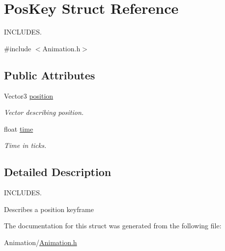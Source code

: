 \hypertarget{structPosKey}{}\section{Pos\+Key Struct Reference}
\label{structPosKey}


I\+N\+C\+L\+U\+D\+ES.  




{\ttfamily \#include $<$Animation.\+h$>$}

\subsection*{Public Attributes}
\begin{DoxyCompactItemize}
\item 
\mbox{\label{structPosKey_ab4d6a9df96d150ef750e23f086aacecb}} 
Vector3 \hyperlink{structPosKey_ab4d6a9df96d150ef750e23f086aacecb}{position}
\begin{DoxyCompactList}\small\item\em Vector describing position. \end{DoxyCompactList}\item 
\mbox{\label{structPosKey_a9ff7590acc0c4dba992a3a33b3651173}} 
float \hyperlink{structPosKey_a9ff7590acc0c4dba992a3a33b3651173}{time}
\begin{DoxyCompactList}\small\item\em Time in ticks. \end{DoxyCompactList}\end{DoxyCompactItemize}


\subsection{Detailed Description}
I\+N\+C\+L\+U\+D\+ES. 

Describes a position keyframe 

The documentation for this struct was generated from the following file\+:\begin{DoxyCompactItemize}
\item 
Animation/\hyperlink{Animation_8h}{Animation.\+h}\end{DoxyCompactItemize}
